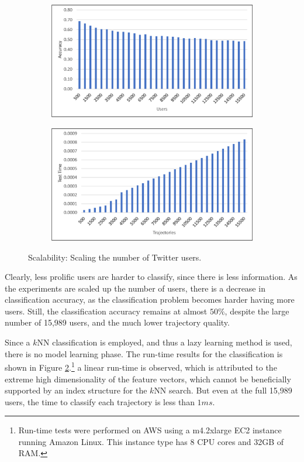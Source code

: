 \begin{figure}[p]
	\centering
  \begin{subfigure}[b]{\textwidth}
    \centering
    \includegraphics[width = 0.8\columnwidth]{figures/scalability_accuracy}
    \label{fig:scalability_accuracy}
  \end{subfigure}

  \begin{subfigure}[b]{\textwidth}
    \centering
    \includegraphics[width = 0.8\columnwidth]{figures/scalability_runtime}
    \label{fig:scalability_runtime}
  \end{subfigure}
  \caption{Scalability: Scaling the number of Twitter users.}
  \label{fig:scalability_results}
	\figSpace
\end{figure}

Clearly, less prolific users are harder to classify, since there is less information. As the experiments are scaled up the number of users, there is a decrease in classification accuracy, as the classification problem becomes harder having more users. Still, the classification accuracy remains at almost $50\%$, despite the large number of  15,989 users, and the much lower trajectory quality.

Since a $k$NN classification is employed, and thus a lazy learning method is used, there is no model learning phase. The run-time results for the classification is shown in Figure \ref{fig:scalability_runtime}.\footnote{Run-time tests were performed on AWS using a m4.2xlarge EC2 instance running Amazon Linux. This instance type has 8 CPU cores and 32GB of RAM.} a linear run-time is observed, which is attributed to the extreme high dimensionality of the feature vectors, which cannot be beneficially supported by an index structure for the $k$NN search. But even at the full 15,989 users, the time to classify each trajectory is less than $1ms$.
